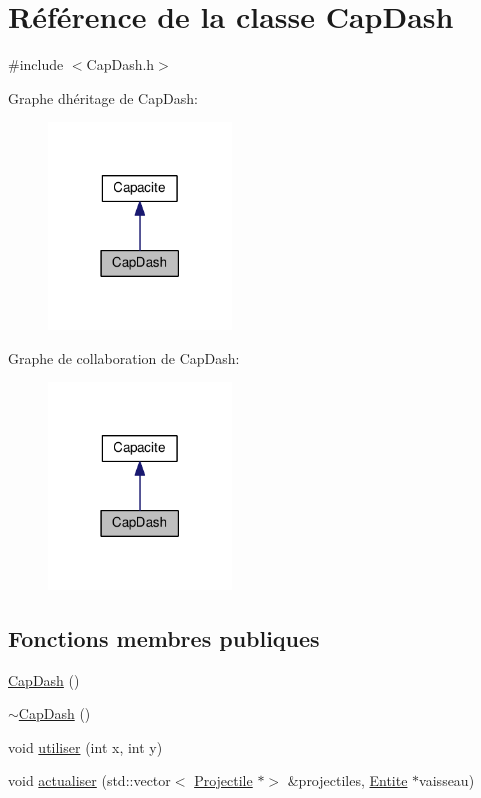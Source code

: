 \hypertarget{class_cap_dash}{}\section{Référence de la classe Cap\+Dash}
\label{class_cap_dash}


{\ttfamily \#include $<$Cap\+Dash.\+h$>$}



Graphe d\textquotesingle{}héritage de Cap\+Dash\+:\nopagebreak
\begin{figure}[H]
\begin{center}
\leavevmode
\includegraphics[width=138pt]{class_cap_dash__inherit__graph}
\end{center}
\end{figure}


Graphe de collaboration de Cap\+Dash\+:\nopagebreak
\begin{figure}[H]
\begin{center}
\leavevmode
\includegraphics[width=138pt]{class_cap_dash__coll__graph}
\end{center}
\end{figure}
\subsection*{Fonctions membres publiques}
\begin{DoxyCompactItemize}
\item 
\hyperlink{class_cap_dash_ac38287e31284b6b5ac8add730830bfed}{Cap\+Dash} ()
\item 
\hyperlink{class_cap_dash_aa935262b9ebdaf197294aba7211663cc}{$\sim$\+Cap\+Dash} ()
\item 
void \hyperlink{class_cap_dash_ada59ecb62d2c18f6bb6b4acf28a2da93}{utiliser} (int x, int y)
\item 
void \hyperlink{class_cap_dash_a886522c648db49b81c330737ad96a517}{actualiser} (std\+::vector$<$ \hyperlink{class_projectile}{Projectile} $\ast$$>$ \&projectiles, \hyperlink{class_entite}{Entite} $\ast$vaisseau)
\end{DoxyCompactItemize}
